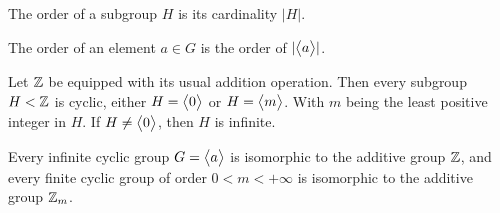 \documentclass[../main-manifolds.tex]{subfiles}
\begin{document}
\begin{definition}\label{hungerford-chp1:order-subgroup-definition}
    The order of a subgroup $H$ is its cardinality $|H|$.
\end{definition}

\begin{definition}\label{hungerford-chp1:order-element-definition}
    The order of an element $a\in G$ is the order of $| \mathopen{\big\langle} a \mathclose{\big\rangle} |$.
\end{definition}

\begin{wts}\label{hungerford-chp1:theorem3.1}
    Let $\mathbb{Z}$ be equipped with its usual addition operation. Then every subgroup $H<\mathbb{Z}$ is cyclic, either $H= \mathopen{\big\langle} 0 \mathclose{\big\rangle} $ or $H= \mathopen{\big\langle} m \mathclose{\big\rangle} $. With $m$ being the least positive integer in $H$. If $H\neq \mathopen{\big\langle} 0 \mathclose{\big\rangle} $, then $H$ is infinite.
\end{wts}
\begin{wts}\label{hungerford-chp1:theorem3.2}
    Every infinite cyclic group $G= \mathopen{\big\langle} a \mathclose{\big\rangle} $ is isomorphic to the additive group $\mathbb{Z}$, and every finite cyclic group of order $0<m<+\infty$ is isomorphic to the additive group $\mathbb{Z}_m$.
\end{wts}
\end{document}
